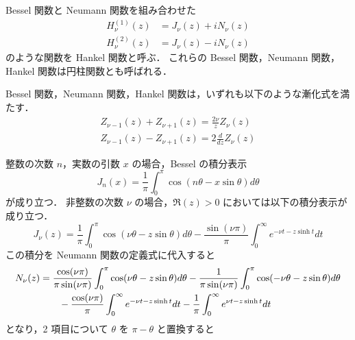 Bessel 関数と Neumann 関数を組み合わせた
\begin{align}
    H_{\nu}^{(1)}(z) & = J_{\nu}(z) + i N_{\nu}(z) \\
    H_{\nu}^{(2)}(z) & = J_{\nu}(z) - i N_{\nu}(z)
\end{align}
のような関数を Hankel 関数と呼ぶ．
これらの Bessel 関数，Neumann 関数，Hankel 関数は円柱関数とも呼ばれる．

Bessel 関数，Neumann 関数，Hankel 関数は，いずれも以下のような漸化式を満たす．
\begin{gather}
    Z_{\nu - 1}(z) + Z_{\nu + 1}(z) = \frac{2\nu}{z} Z_{\nu}(z) \\
    Z_{\nu - 1}(z) - Z_{\nu + 1}(z) = 2 \frac{d}{dz} Z_{\nu}(z)
\end{gather}

整数の次数 $n$，実数の引数 $x$ の場合，Bessel の積分表示
\begin{equation}
    J_n(x) = \frac{1}{\pi} \int_0^\pi \cos(n \theta - x \sin\theta) d\theta
\end{equation}
が成り立つ．
非整数の次数 $\nu$ の場合，$\Re(z) > 0$ においては以下の積分表示が成り立つ．
\begin{equation}
    J_{\nu}(z) = \frac{1}{\pi} \int_0^\pi \cos(\nu \theta - z \sin \theta) d\theta
    - \frac{\sin(\nu \pi)}{\pi} \int_0^\infty e^{-\nu t -z \sinh{t}} dt
\end{equation}
この積分を Neumann 関数の定義式に代入すると
\begin{align}
    N_{\nu}(z)
     & =
    \frac{\cos(\nu \pi)}{\pi \sin(\nu \pi)} \int_0^\pi \cos(\nu \theta - z \sin \theta) d\theta
    - \frac{1}{\pi \sin(\nu \pi)} \int_0^\pi \cos(-\nu \theta - z \sin \theta) d\theta
    \notag \\ &\hspace{2em}
    - \frac{\cos(\nu \pi)}{\pi} \int_0^\infty e^{-\nu t -z \sinh{t}} dt
    - \frac{1}{\pi} \int_0^\infty e^{\nu t -z \sinh{t}} dt
\end{align}
となり，2 項目について $\theta$ を $\pi - \theta$ と置換すると
